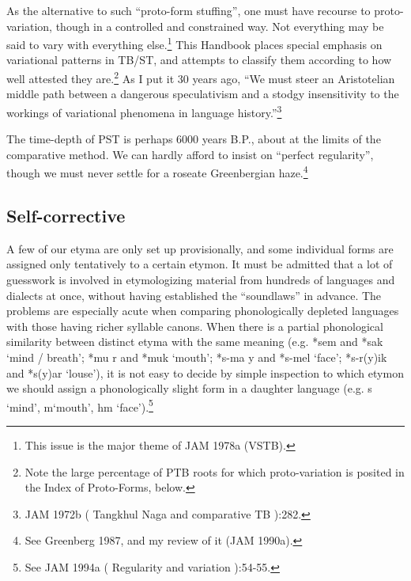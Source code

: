 \documentclass[10pt]{article}
\begin{document}
As the alternative to such ``proto-form stuffing'', one must have recourse to proto-variation, though in a controlled and constrained way. Not everything may be said to vary with everything else.\footnote{This issue is the major theme of JAM 1978a (VSTB).} This Handbook places special emphasis on variational patterns in TB/ST, and attempts to classify them according to how well attested they are.\footnote{Note the large percentage of PTB roots for which proto-variation is posited in the Index of Proto-Forms, below.} As I put it 30 years ago, ``We must steer an Aristotelian middle path between a dangerous speculativism and a stodgy insensitivity to the workings of variational phenomena in language history.''\footnote{JAM 1972b ( Tangkhul Naga and comparative TB ):282.}

The time-depth of PST is perhaps 6000 years B.P., about at the limits of the comparative method. We can hardly afford to insist on ``perfect regularity'', though we must never settle for a roseate Greenbergian haze.\footnote{See Greenberg 1987, and my review of it (JAM 1990a).}

\subsection{Self-corrective}
A few of our etyma are only set up provisionally, and some individual forms are assigned only tentatively to a certain etymon. It must be admitted that a lot of guesswork is involved in etymologizing material from hundreds of languages and dialects at once, without having established the ``soundlaws'' in advance. The problems are especially acute when comparing phonologically depleted languages with those having richer syllable canons. When there is a partial phonological similarity between distinct etyma with the same meaning (e.g. *sem and *sak `mind / breath'; *mu r and *muk `mouth'; *s-ma y and *s-mel `face'; *s-r(y)ik and *s(y)ar `louse'), it is not easy to decide by simple inspection to which etymon we should assign a phonologically slight form in a daughter language (e.g. s  `mind', m\xbf  `mouth', hm  `face').\footnote{See JAM 1994a ( Regularity and variation ):54-55.}
\end{document}
